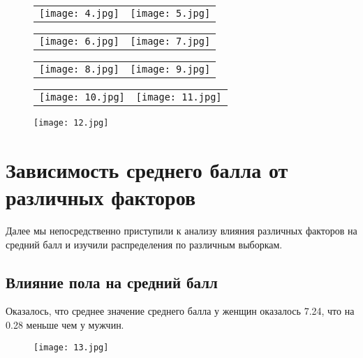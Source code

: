 \documentclass[a4paper,12pt]{article}
\begin{document}
\begin{figure}[h!]
\begin{tabular}{cc}
\texttt{[image: 4.jpg]}
&
\texttt{[image: 5.jpg]}
\end{tabular}
\end{figure}

\begin{figure}[h!]\centering
\begin{tabular}{cc}
\texttt{[image: 6.jpg]}
&
\texttt{[image: 7.jpg]}
\end{tabular}
\end{figure}

\begin{figure}[h!]\centering
\begin{tabular}{cc}
\texttt{[image: 8.jpg]}
&
\texttt{[image: 9.jpg]}
\end{tabular}
\end{figure}

\begin{figure}[h!]\centering
\begin{tabular}{cc}
\texttt{[image: 10.jpg]}
&
\texttt{[image: 11.jpg]}
\end{tabular}
\end{figure}

\begin{figure}[h!]\centering
    \texttt{[image: 12.jpg]}
    \label{1_1}
\end{figure}
\newpage

\newpage


\section{Зависимость среднего балла от различных факторов}
Далее мы непосредственно приступили к анализу влияния различных факторов на средний балл и изучили распределения по различным выборкам.
\subsection{Влияние пола на средний балл}
Оказалось, что среднее значение среднего балла у женщин оказалось 7.24, что на 0.28 меньше чем у мужчин.
\begin{figure}[h!]\centering
    \texttt{[image: 13.jpg]}
    \label{1_1}
\end{figure}
\end{document}
